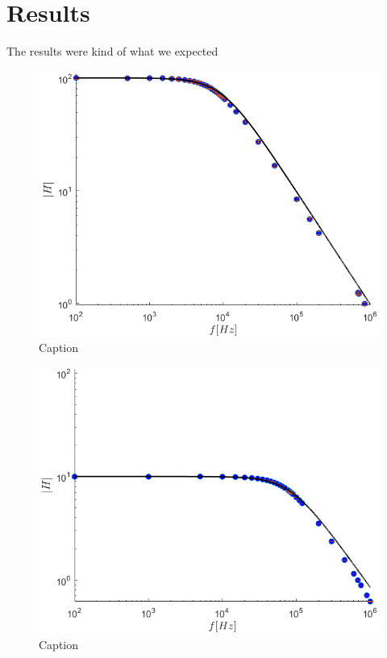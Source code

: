 \documentclass[letterpaper,12pt]{article}
\begin{document}
\section{Results}
The results were kind of what we expected
\begin{figure}[ht]
    \centering
    \includegraphics[scale = .55]{HighGain.png}
    \caption{Caption}
    \label{HighG}
\end{figure}


\begin{figure}[ht]
    \centering
    \includegraphics[scale = .55]{LowGain.png}
    \caption{Caption}
    \label{LowG}
\end{figure}
\end{document}
